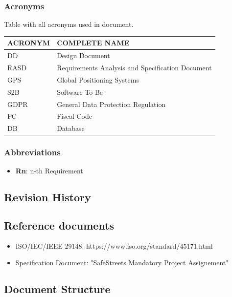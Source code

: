 \documentclass{article}
\begin{document}
\subsubsection{Acronyms}
Table with all acronyms used in document.
\begin{center}
\begin{tabular}{ | l | l |}
    \hline
    ACRONYM & COMPLETE NAME \\
    \hline
    DD & Design Document \\
    \hline
    RASD & Requirements Analysis and Specification Document \\
    \hline
    GPS & Global Positioning Systems \\
    \hline
    S2B & Software To Be \\
    \hline
    GDPR & General Data Protection Regulation \\
    \hline 
    FC & Fiscal Code \\
    \hline
    DB & Database \\
    \hline
\end{tabular}
\end{center}

\subsubsection{Abbreviations}
\begin{itemize}
    \item \textbf{Rn}: n-th Requirement 
\end{itemize}

\subsection{Revision History}

\subsection{Reference documents}
\begin{itemize}
    \item ISO/IEC/IEEE 29148: https://www.iso.org/standard/45171.html
    \item Specification Document: "SafeStreets Mandatory Project Assignement"
\end{itemize}

\subsection{Document Structure}
\end{document}
